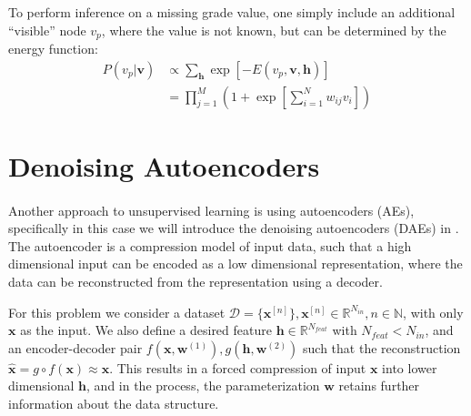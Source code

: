 To perform inference on a missing grade value,
one simply include an additional ``visible'' node $v_p$,
where the value is not known, 
but can be determined by the energy function:
%
\begin{equation}
\begin{aligned}
    P(v_p|\mathbf{v}) &\propto
        \displaystyle\sum_{\mathbf{h}} 
        \exp[-E(v_p,\mathbf{v},\mathbf{h})] \\
    &= \prod_{j=1}^M \left( 1 + 
        \exp\left[\sum_{i=1}^N w_{ij} v_i\right]
        \right)
\end{aligned}
\end{equation}












\section{Denoising Autoencoders} \label{sc:dae}

\paragraph{}
Another approach to unsupervised learning is using autoencoders (AEs), 
specifically in this case we will introduce the 
denoising autoencoders (DAEs) in \cite{VLLBM10}.
The autoencoder is a compression model of input data, 
such that a high dimensional input can be encoded as 
a low dimensional representation,
where the data can be reconstructed from the representation 
using a decoder.

For this problem we consider a dataset 
$\mathcal{D} = \{\mathbf{x}^{[n]}\}, 
\mathbf{x}^{[n]} \in \mathbb{R}^{N_{in}},
n \in \mathbb{N}$,
with only $\mathbf{x}$ as the input.
We also define a desired feature $\mathbf{h} \in \mathbb{R}^{N_{feat}} $
with $N_{feat} < N_{in}$,
and an encoder-decoder pair 
$f(\mathbf{x},\mathbf{w}^{(1)}), g(\mathbf{h},\mathbf{w}^{(2)})$
such that the reconstruction 
$\hat{\mathbf{x}} = g \circ f(\mathbf{x}) \approx \mathbf{x}$.
This results in a forced compression of input $\mathbf{x}$ 
into lower dimensional $\mathbf{h}$,
and in the process, the parameterization $\mathbf{w}$ retains 
further information about the data structure.

